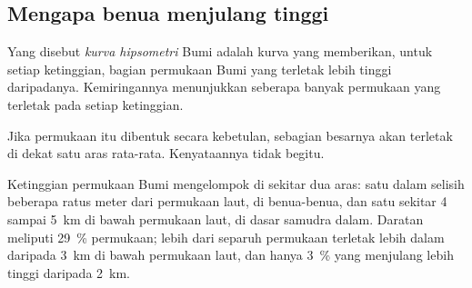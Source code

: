 \subsection{Mengapa benua menjulang tinggi}

\begin{definition}\label{def:g11:lithosphere-asthenosphere:hypsometry}
Yang disebut \emph{kurva hipsometri} Bumi adalah kurva
yang memberikan, untuk setiap ketinggian, bagian permukaan Bumi yang terletak
lebih tinggi daripadanya. Kemiringannya menunjukkan seberapa banyak permukaan
yang terletak pada setiap ketinggian.
\end{definition}

Jika permukaan itu dibentuk secara kebetulan, sebagian besarnya akan terletak di
dekat satu aras rata-rata. Kenyataannya tidak begitu.

\begin{proposition}\label{prop:g11:lithosphere-asthenosphere:two-levels}
Ketinggian permukaan Bumi mengelompok di sekitar dua aras: satu dalam selisih
beberapa ratus meter dari permukaan laut, di benua-benua, dan satu sekitar 4
sampai \qty{5}{km} di bawah permukaan laut, di dasar samudra dalam. Daratan
meliputi \qty{29}{\percent} permukaan; lebih dari separuh permukaan terletak
lebih dalam daripada \qty{3}{km} di bawah permukaan laut, dan hanya
\qty{3}{\percent} yang menjulang lebih tinggi daripada \qty{2}{km}.
\end{proposition}

